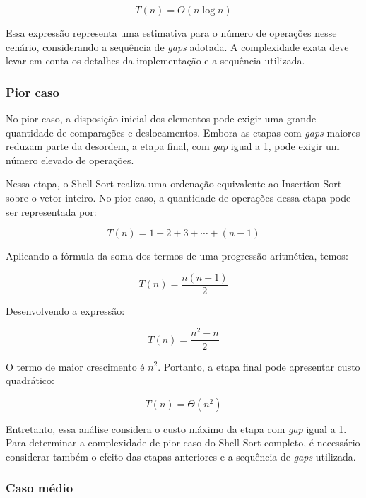\begin{equation}
T(n) = O(n\log n)
\end{equation}

Essa expressão representa uma estimativa para o número de operações nesse cenário, considerando a sequência de \textit{gaps} adotada. A complexidade exata deve levar em conta os detalhes da implementação e a sequência utilizada.

\subsubsection{Pior caso}

No pior caso, a disposição inicial dos elementos pode exigir uma grande quantidade de comparações e deslocamentos. Embora as etapas com \textit{gaps} maiores reduzam parte da desordem, a etapa final, com \textit{gap} igual a 1, pode exigir um número elevado de operações.

Nessa etapa, o Shell Sort realiza uma ordenação equivalente ao Insertion Sort sobre o vetor inteiro. No pior caso, a quantidade de operações dessa etapa pode ser representada por:

\begin{equation}
T(n) = 1+2+3+\cdots+(n-1)
\end{equation}

Aplicando a fórmula da soma dos termos de uma progressão aritmética, temos:

\begin{equation}
T(n) = \frac{n(n-1)}{2}
\end{equation}

Desenvolvendo a expressão:

\begin{equation}
T(n) = \frac{n^2-n}{2}
\end{equation}

O termo de maior crescimento é \(n^2\). Portanto, a etapa final pode apresentar custo quadrático:

\begin{equation}
T(n) = \Theta(n^2)
\end{equation}

Entretanto, essa análise considera o custo máximo da etapa com \textit{gap} igual a 1. Para determinar a complexidade de pior caso do Shell Sort completo, é necessário considerar também o efeito das etapas anteriores e a sequência de \textit{gaps} utilizada.

\subsubsection{Caso médio}

